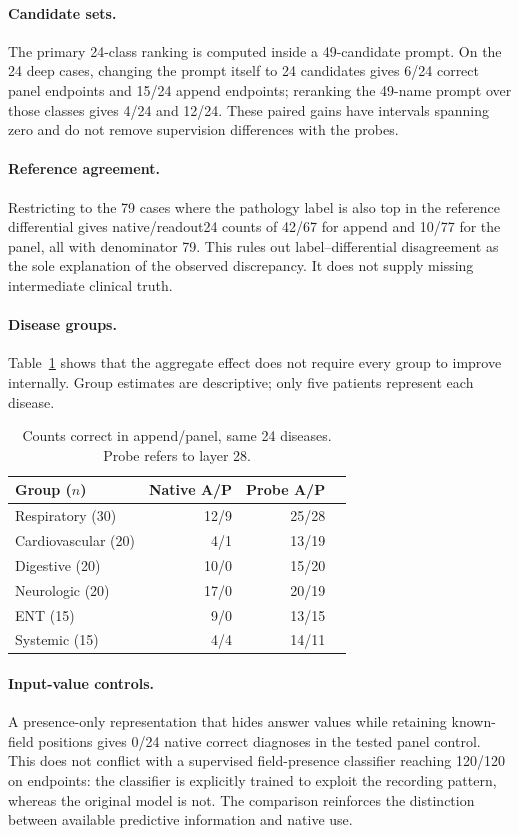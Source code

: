 \paragraph{Candidate sets.} The primary 24-class ranking is computed inside a 49-candidate prompt. On the 24 deep cases, changing the prompt itself to 24 candidates gives 6/24 correct panel endpoints and 15/24 append endpoints; reranking the 49-name prompt over those classes gives 4/24 and 12/24. These paired gains have intervals spanning zero and do not remove supervision differences with the probes.

\paragraph{Reference agreement.} Restricting to the 79 cases where the pathology label is also top in the reference differential gives native/readout24 counts of 42/67 for append and 10/77 for the panel, all with denominator 79. This rules out label--differential disagreement as the sole explanation of the observed discrepancy. It does not supply missing intermediate clinical truth.

\paragraph{Disease groups.} Table~\ref{tab:families} shows that the aggregate effect does not require every group to improve internally. Group estimates are descriptive; only five patients represent each disease.
\begin{table}[h]
\centering\small
\begin{tabular}{lrrr}\toprule
Group ($n$) & Native A/P & Probe A/P\\\midrule
Respiratory (30) & 12/9 & 25/28\\
Cardiovascular (20) & 4/1 & 13/19\\
Digestive (20) & 10/0 & 15/20\\
Neurologic (20) & 17/0 & 20/19\\
ENT (15) & 9/0 & 13/15\\
Systemic (15) & 4/4 & 14/11\\\bottomrule
\end{tabular}
\caption{Counts correct in append/panel, same 24 diseases. Probe refers to layer 28.}\label{tab:families}
\end{table}

\paragraph{Input-value controls.} A presence-only representation that hides answer values while retaining known-field positions gives 0/24 native correct diagnoses in the tested panel control. This does not conflict with a supervised field-presence classifier reaching 120/120 on endpoints: the classifier is explicitly trained to exploit the recording pattern, whereas the original model is not. The comparison reinforces the distinction between available predictive information and native use.

